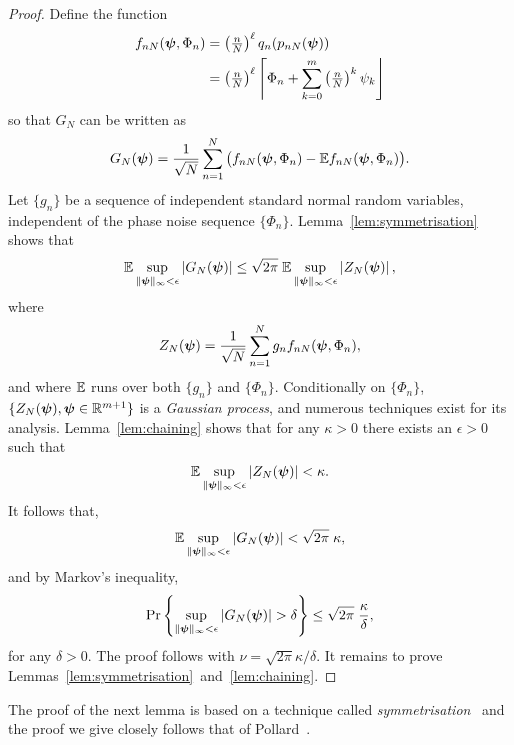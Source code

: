 \documentclass[journal]{IEEEtran}
\begin{document}
\begin{proof}
Define the function 
\begin{align*}
f_{nN}(\boldsymbol{\psi}, \Phi_n) &= \left( \tfrac{n}{N}\right)^\ell q_n(p_{nN}(\boldsymbol{\psi})) \\
&= \left( \tfrac{n}{N}\right)^\ell {\left\lceil \Phi_n + \sum_{k=0}^m\left( \tfrac{n}{N}\right)^k\psi_k \right\rfloor}
\end{align*}
so that $G_N$ can be written as
\[
G_N(\boldsymbol{\psi}) = \frac{1}{\sqrt{N}} \sum_{n=1}^{N} \big( f_{nN}(\boldsymbol{\psi}, \Phi_n) - {\mathbb E} f_{nN}(\boldsymbol{\psi}, \Phi_n) \big).
\]
Let $\{g_n\}$ be a sequence of independent standard normal random variables, independent of the phase noise sequence $\{\Phi_n\}$.  Lemma~\ref{lem:symmetrisation} shows that
\[
{\mathbb E} \sup_{\|\boldsymbol{\psi}\|_{\infty} < \epsilon} \left\vert  G_N(\boldsymbol{\psi}) \right\vert \leq \sqrt{2\pi} \; {\mathbb E} \sup_{\|\boldsymbol{\psi}\|_{\infty} < \epsilon}  \left\vert  Z_N(\boldsymbol{\psi})  \right\vert,
\]
where 
\begin{equation}\label{eq:ZpsiCondGaussProc}
Z_N(\psibf) = \frac{1}{\sqrt{N}} \sum_{n=1}^{N} g_n f_{nN}(\psibf, \Phi_n),
\end{equation}
and where ${\mathbb E}$ runs over both $\{g_n\}$ and $\{\Phi_n\}$.  Conditionally on $\{\Phi_n\}$, $\{Z_N(\boldsymbol{\psi}), \boldsymbol{\psi} \in {\mathbb R}^{m+1} \}$ is a \emph{Gaussian process}, and numerous techniques exist for its analysis.  Lemma~\ref{lem:chaining} shows that for any $\kappa > 0$ there exists an $\epsilon > 0$ such that
\[
{\mathbb E} \sup_{\|\boldsymbol{\psi}\|_{\infty} < \epsilon} \left\vert  Z_N(\boldsymbol{\psi})  \right\vert < \kappa.
\]
It follows that,
\[
{\mathbb E} \sup_{\|\boldsymbol{\psi}\|_{\infty} < \epsilon} \left\vert  G_N(\boldsymbol{\psi}) \right\vert  <  \sqrt{2\pi} \; \kappa,
\]
and by Markov's inequality,
\[
\operatorname{Pr} {\left\{   \sup_{\|\boldsymbol{\psi}\|_{\infty} < \epsilon} \left\vert  G_N(\boldsymbol{\psi}) \right\vert > \delta  \right\}} \leq  \sqrt{2\pi} \; \frac{\kappa}{\delta},
\]
for any $\delta > 0$.  The proof follows with $\nu =  \sqrt{2\pi} \kappa/\delta$.  It remains to prove Lemmas~\ref{lem:symmetrisation}~and~\ref{lem:chaining}.

\end{proof}

The proof of the next lemma is based on a technique called \emph{symmetrisation}~\cite{Gine_Zinn_symmetrisation_1984} and the proof we give closely follows that of Pollard~\cite[Section 4]{Pollard_asymp_empi_proc_1989}.
\end{document}
